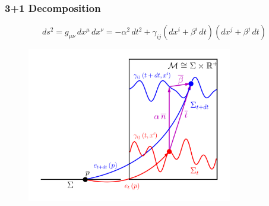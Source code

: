 \documentclass{beamer}
\begin{document}
\begin{frame}
\frametitle{3+1 Decomposition}

  \begin{equation*}
    ds^{2}
    =g_{\mu\nu}\,dx^{\mu}\,dx^{\nu}
    =-\alpha^{2}\,dt^{2}
     +\gamma_{ij}\left(dx^{i}+\beta^{i}\,dt\right)
                 \left(dx^{j}+\beta^{j}\,dt\right)
  \end{equation*}

  \vspace{-0.5em}

  \begin{figure}[htb!]
    \centering
    \includegraphics[width=0.8\textwidth]{fig.1p1.png}
  \end{figure}

\end{frame}
\end{document}
